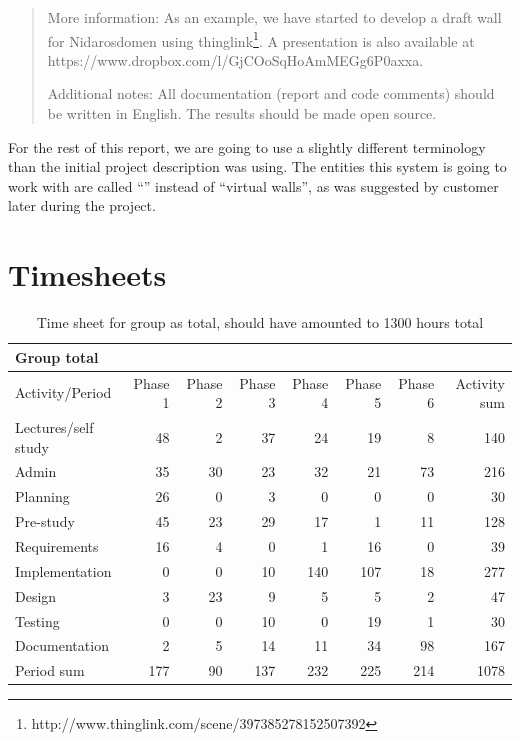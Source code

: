 \documentclass[11pt]{book}
\begin{document}
\begin{quotation}
More information: As an example, we have started to develop a draft wall for Nidarosdomen using thinglink\footnote{http://www.thinglink.com/scene/397385278152507392}. A presentation is also available at https://www.dropbox.com/l/GjCOoSqHoAmMEGg6P0axxa.

Additional notes: All documentation (report and code comments) should be written in English. The results should be made open source.\cite[p. 47]{compendium}
\end{quotation}

For the rest of this report, we are going to use a slightly different terminology than the initial project description was using. The entities this system is going to work with are called ``\wallentityp'' instead of ``virtual walls'', as was suggested by customer later during the project.


\chapter{Timesheets}
\begin{table}[H]
\centering
\begin{tabular}{| l | r | r | r | r | r | r | r |}
    \hline
    Group total         &          &          &          &          &             &             &              \\ \hline                        
    Activity/Period     & Phase 1  & Phase 2  & Phase  3 & Phase 4  & Phase 5     & Phase 6     & Activity sum \\ \hline
    Lectures/self study & 48 & 2 & 37 & 24 & 19 & 8 & 140\\ \hline
    Admin & 35 & 30 & 23 & 32 & 21 & 73 & 216\\ \hline
    Planning & 26 & 0 & 3 & 0 & 0 & 0 & 30\\ \hline
    Pre-study & 45 & 23 & 29 & 17 & 1 & 11 & 128\\ \hline
    Requirements & 16 & 4 & 0 & 1 & 16 & 0 & 39\\ \hline
    Implementation & 0 & 0 & 10 & 140 & 107 & 18 & 277\\ \hline
    Design & 3 & 23 & 9 & 5 & 5 & 2 & 47\\ \hline
    Testing & 0 & 0 & 10 & 0 & 19 & 1 & 30\\ \hline
    Documentation & 2 & 5 & 14 & 11 & 34 & 98 & 167\\ \hline
    Period sum & 177 & 90 & 137 & 232 & 225 & 214 & 1078\\ \hline
\end{tabular}
\caption{Time sheet for group as total, should have amounted to 1300 hours total}
\label{tab:appendix_timesheets_group}
\end{table}
\end{document}
